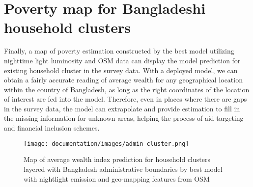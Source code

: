 \documentclass[solid,math,chem,code,plot,gloss]{bmc}
\begin{document}
\section{Poverty map for Bangladeshi household clusters}

Finally, a map of poverty estimation constructed by the best model utilizing nighttime light luminosity and OSM data can display the model prediction for existing household cluster in the survey data. With a deployed model, we can obtain a fairly accurate reading of average wealth for any geographical location within the country of Bangladesh, as long as the right coordinates of the location of interest are fed into the model. Therefore, even in places where there are gaps in the survey data, the model can extrapolate and provide estimation to fill in the missing information for unknown areas, helping the process of aid targeting and financial inclusion schemes. 

\begin{figure}[hbt!]
    \centering
    \texttt{[image: documentation/images/admin\_cluster.png]}
    \caption{Map of average wealth index prediction for household clusters layered with Bangladesh administrative boundaries by best model with nightlight emission and geo-mapping features from OSM}
    \label{fig:admin}
\end{figure}





\end{document}
